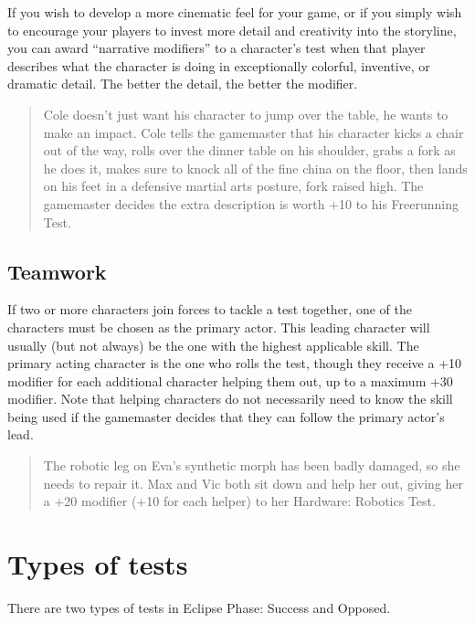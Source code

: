 If you wish to develop a more cinematic feel for your game, or if you simply wish to encourage your players to invest more detail and creativity into the storyline, you can award “narrative modifiers” to a character's test when that player describes what the character is doing in exceptionally colorful, inventive, or dramatic detail. The better the detail, the better the modifier.

\begin{quotation}
Cole doesn't just want his character to jump over the table, he wants to make an impact. Cole tells the gamemaster that his character kicks a chair out of the way, rolls over the dinner table on his shoulder, grabs a fork as he does it, makes sure to knock all of the fine china on the floor, then lands on his feet in a defensive martial arts posture, fork raised high. The gamemaster decides the extra description is worth +10 to his Freerunning Test.
\end{quotation}

\subsection{Teamwork}
\label{sec:teamwork}

If two or more characters join forces to tackle a test together, one of the characters must be chosen as the primary actor. This leading character will usually (but not always) be the one with the highest applicable skill. The primary acting character is the one who rolls the test, though they receive a +10 modifier for each additional character helping them out, up to a maximum +30 modifier. Note that helping characters do not necessarily need to know the skill being used if the gamemaster decides that they can follow the primary actor's lead.

\begin{quotation}
The robotic leg on Eva's synthetic morph has been badly damaged, so she needs to repair it. Max and Vic both sit down and help her out, giving her a +20 modifier (+10 for each helper) to her Hardware: Robotics Test.
\end{quotation}

\section{Types of tests}
\label{sec:types-tests}

There are two types of tests in Eclipse Phase: Success and Opposed.

